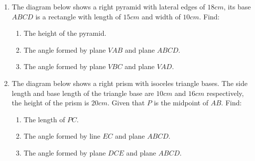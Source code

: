 \documentclass{report}
\begin{document}
\begin{multicols}{2}
\begin{enumerate}
        \item The diagram below shows a right pyramid with lateral edges of $18cm$, its base
              $ABCD$ is a rectangle with length of $15cm$ and width of $10cm$. Find:
              \begin{enumerate}
                  \item The height of the pyramid.
                  \item The angle formed by plane $VAB$ and plane $ABCD$.
                  \item The angle formed by plane $VBC$ and plane $VAD$.
              \end{enumerate}
              \begin{center}
              \end{center}
        \item The diagram below shows a right prism with isoceles triangle bases. The side
              length and base length of the triangle base are $10cm$ and $16cm$ respectively,
              the height of the prism is $20cm$. Given that $P$ is the midpoint of $AB$.
              Find:
              \begin{enumerate}
                  \item The length of $PC$.
                  \item The angle formed by line $EC$ and plane $ABCD$.
                  \item The angle formed by plane $DCE$ and plane $ABCD$.
              \end{enumerate}

\end{enumerate}
\end{multicols}
\end{document}
